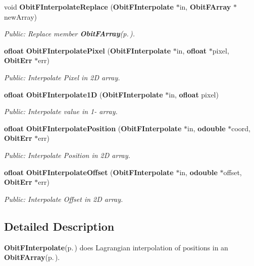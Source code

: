 \begin{CompactItemize}
void {\bf Obit\-FInterpolate\-Replace} ({\bf Obit\-FInterpolate} $\ast$in, {\bf Obit\-FArray} $\ast$new\-Array)
\begin{CompactList}\small\item\em Public: Replace member {\bf Obit\-FArray}{\rm (p.\,\pageref{structObitFArray})}. \item\end{CompactList}\item 
{\bf ofloat} {\bf Obit\-FInterpolate\-Pixel} ({\bf Obit\-FInterpolate} $\ast$in, {\bf ofloat} $\ast$pixel, {\bf Obit\-Err} $\ast$err)
\begin{CompactList}\small\item\em Public: Interpolate Pixel in 2D array. \item\end{CompactList}\item 
{\bf ofloat} {\bf Obit\-FInterpolate1D} ({\bf Obit\-FInterpolate} $\ast$in, {\bf ofloat} pixel)
\begin{CompactList}\small\item\em Public: Interpolate value in 1- array. \item\end{CompactList}\item 
{\bf ofloat} {\bf Obit\-FInterpolate\-Position} ({\bf Obit\-FInterpolate} $\ast$in, {\bf odouble} $\ast$coord, {\bf Obit\-Err} $\ast$err)
\begin{CompactList}\small\item\em Public: Interpolate Position in 2D array. \item\end{CompactList}\item 
{\bf ofloat} {\bf Obit\-FInterpolate\-Offset} ({\bf Obit\-FInterpolate} $\ast$in, {\bf odouble} $\ast$offset, {\bf Obit\-Err} $\ast$err)
\begin{CompactList}\small\item\em Public: Interpolate Offset in 2D array. \item\end{CompactList}\end{CompactItemize}


\subsection{Detailed Description}
{\bf Obit\-FInterpolate}{\rm (p.\,\pageref{structObitFInterpolate})} does Lagrangian interpolation of positions in an {\bf Obit\-FArray}{\rm (p.\,\pageref{structObitFArray})}. 

